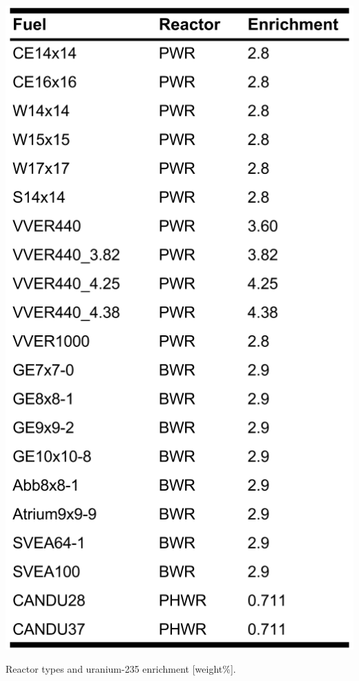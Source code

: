 \begin{table}[H]
  \centering
  \begin{subtable}{\linewidth}
    \centering
    \includegraphics[height=0.7\textheight]{./chapters/demo_method/TrainData.png}
    \caption{Reactor types and uranium-235 enrichment [weight\%].}
    \label{tbl:rxtrtype}
    \vspace*{5mm}
  \end{subtable}

\end{table}
